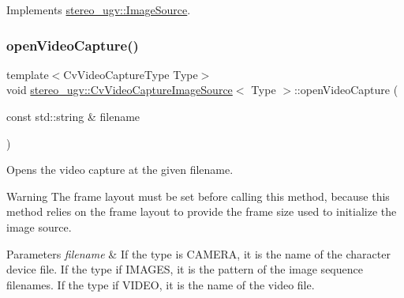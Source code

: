 Implements \hyperlink{classstereo__ugv_1_1ImageSource_a30d9146abcdcef11f03685a9887b96d0}{stereo\+\_\+ugv\+::\+Image\+Source}.

\mbox{\label{classstereo__ugv_1_1CvVideoCaptureImageSource_a47e4a18163b03d4d716284292dbb1d24}} 
\subsubsection{\texorpdfstring{open\+Video\+Capture()}{openVideoCapture()}}
{\footnotesize\ttfamily template$<$Cv\+Video\+Capture\+Type Type$>$ \\
void \hyperlink{classstereo__ugv_1_1CvVideoCaptureImageSource}{stereo\+\_\+ugv\+::\+Cv\+Video\+Capture\+Image\+Source}$<$ Type $>$\+::open\+Video\+Capture (\begin{DoxyParamCaption}\item[{const std\+::string \&}]{filename }\end{DoxyParamCaption})\hspace{0.3cm}{\ttfamily [inline]}}



Opens the video capture at the given filename. 

\begin{DoxyWarning}{Warning}
The frame layout must be set before calling this method, because this method relies on the frame layout to provide the frame size used to initialize the image source. 
\end{DoxyWarning}

\begin{DoxyParams}{Parameters}
{\em filename} & If the type is C\+A\+M\+E\+RA, it is the name of the character device file. If the type if I\+M\+A\+G\+ES, it is the pattern of the image sequence filenames. If the type if V\+I\+D\+EO, it is the name of the video file. \\
\hline
\end{DoxyParams}
\mbox{\label{classstereo__ugv_1_1CvVideoCaptureImageSource_a6636c97811bb28d59453c3865b0bda69}} 
